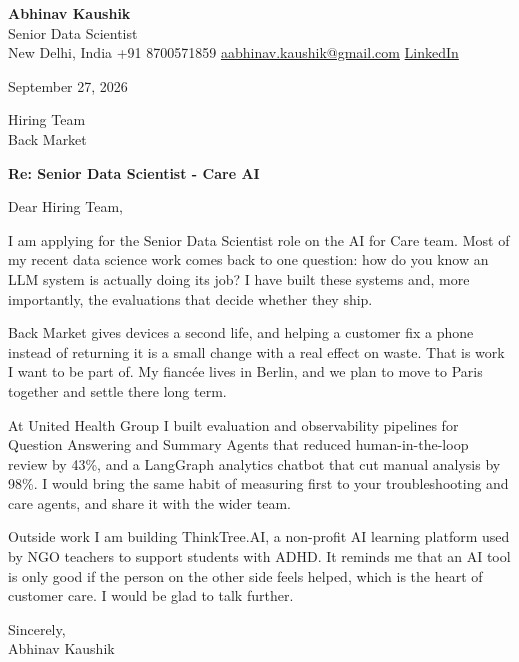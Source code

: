 \documentclass[11pt,a4paper]{article}
\begin{document}
{\Large\bfseries Abhinav Kaushik}\\
Senior Data Scientist\\
New Delhi, India \textbar{} +91 8700571859 \textbar{} \href{mailto:aabhinav.kaushik@gmail.com}{aabhinav.kaushik@gmail.com} \textbar{} \href{https://www.linkedin.com/in/abhinav-kaushik10/}{LinkedIn}  

September 27, 2026

Hiring Team\\
Back Market

\textbf{Re: Senior Data Scientist - Care AI}

Dear Hiring Team,

I am applying for the Senior Data Scientist role on the AI for Care team. Most of my recent data science work comes back to one question: how do you know an LLM system is actually doing its job? I have built these systems and, more importantly, the evaluations that decide whether they ship.

Back Market gives devices a second life, and helping a customer fix a phone instead of returning it is a small change with a real effect on waste. That is work I want to be part of. My fiancée lives in Berlin, and we plan to move to Paris together and settle there long term.

At United Health Group I built evaluation and observability pipelines for Question Answering and Summary Agents that reduced human-in-the-loop review by 43\%, and a LangGraph analytics chatbot that cut manual analysis by 98\%. I would bring the same habit of measuring first to your troubleshooting and care agents, and share it with the wider team.

Outside work I am building ThinkTree.AI, a non-profit AI learning platform used by NGO teachers to support students with ADHD. It reminds me that an AI tool is only good if the person on the other side feels helped, which is the heart of customer care. I would be glad to talk further.

Sincerely,\\[4pt]
Abhinav Kaushik
\end{document}
